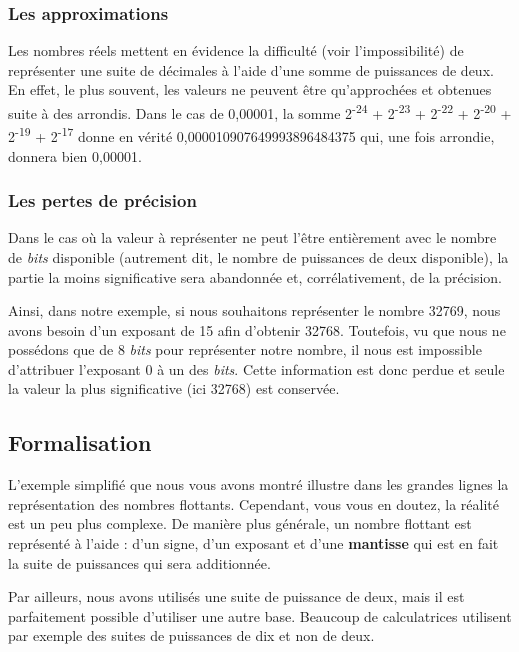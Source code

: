 \subsubsection{Les approximations}
\label{les-approximations}

Les nombres réels mettent en évidence la difficulté (voir
l'impossibilité) de représenter une suite de décimales à l'aide d'une
somme de puissances de deux. En effet, le plus souvent, les valeurs ne
peuvent être qu'approchées et obtenues suite à des arrondis. Dans le cas
de 0,00001, la somme 2\textsuperscript{-24} + 2\textsuperscript{-23} +
2\textsuperscript{-22} + 2\textsuperscript{-20} + 2\textsuperscript{-19}
+ 2\textsuperscript{-17} donne en vérité 0,000010907649993896484375 qui,
une fois arrondie, donnera bien 0,00001.

\subsubsection{Les pertes de précision}
\label{les-pertes-de-precision}

Dans le cas où la valeur à représenter ne peut l'être entièrement avec
le nombre de \emph{bits} disponible (autrement dit, le nombre de
puissances de deux disponible), la partie la moins significative sera
abandonnée et, corrélativement, de la précision.

Ainsi, dans notre exemple, si nous souhaitons représenter le nombre
32769, nous avons besoin d'un exposant de 15 afin d'obtenir 32768.
Toutefois, vu que nous ne possédons que de 8 \emph{bits} pour
représenter notre nombre, il nous est impossible d'attribuer l'exposant
0 à un des \emph{bits}. Cette information est donc perdue et seule la
valeur la plus significative (ici 32768) est conservée.

\subsection{Formalisation}
\label{formalisation}

L'exemple simplifié que nous vous avons montré illustre dans les grandes
lignes la représentation des nombres flottants. Cependant, vous vous en
doutez, la réalité est un peu plus complexe. De manière plus générale,
un nombre flottant est représenté à l'aide : d'un signe, d'un exposant
et d'une \textbf{mantisse} qui est en fait la suite de puissances qui
sera additionnée.

Par ailleurs, nous avons utilisés une suite de puissance de deux, mais
il est parfaitement possible d'utiliser une autre base. Beaucoup de
calculatrices utilisent par exemple des suites de puissances de dix et
non de deux.

